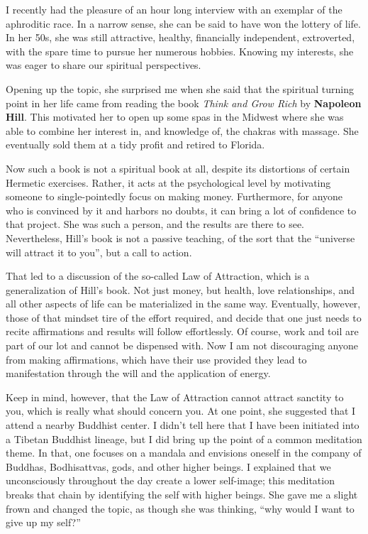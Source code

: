 I recently had the pleasure of an hour long interview with an exemplar of the aphroditic race. In a narrow sense, she can be said to have won the lottery of life. In her 50s, she was still attractive, healthy, financially independent, extroverted, with the spare time to pursue her numerous hobbies. Knowing my interests, she was eager to share our spiritual perspectives.

Opening up the topic, she surprised me when she said that the spiritual turning point in her life came from reading the book \emph{Think and Grow Rich} by \textbf{Napoleon Hill}. This motivated her to open up some spas in the Midwest where she was able to combine her interest in, and knowledge of, the chakras with massage. She eventually sold them at a tidy profit and retired to Florida.

Now such a book is not a spiritual book at all, despite its distortions of certain Hermetic exercises. Rather, it acts at the psychological level by motivating someone to single-pointedly focus on making money. Furthermore, for anyone who is convinced by it and harbors no doubts, it can bring a lot of confidence to that project. She was such a person, and the results are there to see. Nevertheless, Hill's book is not a passive teaching, of the sort that the ``universe will attract it to you'', but a call to action.

That led to a discussion of the so-called Law of Attraction, which is a generalization of Hill's book. Not just money, but health, love relationships, and all other aspects of life can be materialized in the same way. Eventually, however, those of that mindset tire of the effort required, and decide that one just needs to recite affirmations and results will follow effortlessly. Of course, work and toil are part of our lot and cannot be dispensed with. Now I am not discouraging anyone from making affirmations, which have their use provided they lead to manifestation through the will and the application of energy.

Keep in mind, however, that the Law of Attraction cannot attract sanctity to you, which is really what should concern you. At one point, she suggested that I attend a nearby Buddhist center. I didn't tell here that I have been initiated into a Tibetan Buddhist lineage, but I did bring up the point of a common meditation theme. In that, one focuses on a mandala and envisions oneself in the company of Buddhas, Bodhisattvas, gods, and other higher beings. I explained that we unconsciously throughout the day create a lower self-image; this meditation breaks that chain by identifying the self with higher beings. She gave me a slight frown and changed the topic, as though she was thinking, ``why would I want to give up my self?''

